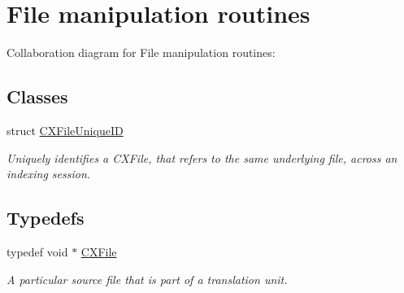 \hypertarget{group__CINDEX__FILES}{}\section{File manipulation routines}
\label{group__CINDEX__FILES}
Collaboration diagram for File manipulation routines\+:
\subsection*{Classes}
\begin{DoxyCompactItemize}
\item 
struct \hyperlink{structCXFileUniqueID}{C\+X\+File\+Unique\+ID}
\begin{DoxyCompactList}\small\item\em Uniquely identifies a C\+X\+File, that refers to the same underlying file, across an indexing session. \end{DoxyCompactList}\end{DoxyCompactItemize}
\subsection*{Typedefs}
\begin{DoxyCompactItemize}
\item 
\mbox{\label{group__CINDEX__FILES_gacfcea9c1239c916597e2e5b3e109215a}} 
typedef void $\ast$ \hyperlink{group__CINDEX__FILES_gacfcea9c1239c916597e2e5b3e109215a}{C\+X\+File}
\begin{DoxyCompactList}\small\item\em A particular source file that is part of a translation unit. \end{DoxyCompactList}\end{DoxyCompactItemize}
